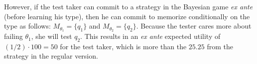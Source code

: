\documentclass{article}
\begin{document}
However, if the test taker can commit to a strategy in the Bayesian game
{\em ex ante} (before learning his type), then he can commit to
memorize conditionally on the type as follows: $M_{\theta_1} =\{q_1\}$ and 
$M_{\theta_2} =\{q_2\}$.  Because the tester cares more about failing
$\theta_1$, she will test $q_2$.  This results in an {\em ex ante} expected
utility of $(1/2) \cdot 100 = 50$ for the test taker, which is more than
the $25.25$ from the strategy in the regular version.

















\end{document}
